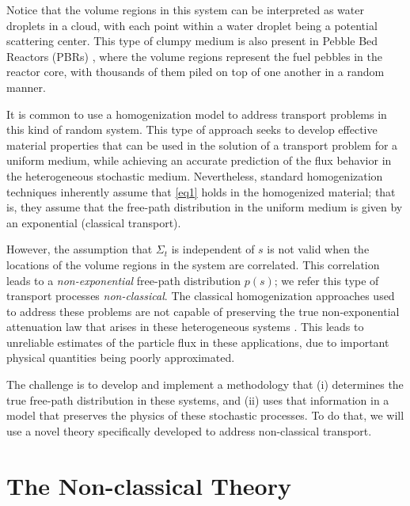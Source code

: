 \documentclass[12pt]{article}
\begin{document}
Notice that the volume regions in this system can be interpreted as water droplets in a cloud, with each point within a water droplet being a potential scattering center.
This type of clumpy medium is also present in Pebble Bed Reactors (PBRs) \cite{fragre11,vaslar14b}, where the volume regions represent the fuel pebbles in the reactor core, with thousands of them piled on top of one another in a random manner.

It is common to use a homogenization model to address transport problems in this kind of random system.
This type of approach seeks to develop effective material properties that can be used in the solution of a transport problem for a uniform medium, while achieving an accurate prediction of the flux behavior in the heterogeneous stochastic medium.
Nevertheless, standard homogenization techniques inherently assume that \cref{eq1} holds in the homogenized material; that is, they assume that the free-path distribution in the uniform medium is given by an exponential (classical transport).  

However, the assumption that $\Sigma_t$ is independent of $s$ is not valid when the locations of the volume regions in the system are correlated.
This correlation leads to a \textit{non-exponential} free-path distribution $p(s)$; we refer this type of transport processes \textit{non-classical}.
The classical homogenization approaches used to address these problems are not capable of preserving the true non-exponential attenuation law that arises in these heterogeneous systems \cite{larvas11,davxu14,vaslar14b,xudav16,vas13}.
This leads to unreliable estimates of the particle flux in these applications, due to important physical quantities being poorly approximated. 

The challenge is to develop and implement a methodology that (i) determines the true free-path distribution in these systems, and (ii) uses that information in a model that preserves the physics of these stochastic processes.
To do that, we will use a novel theory specifically developed to address non-classical transport.   

\section{The Non-classical Theory}
\end{document}
